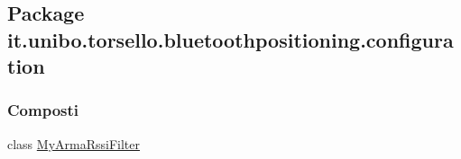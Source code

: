 \hypertarget{namespaceit_1_1unibo_1_1torsello_1_1bluetoothpositioning_1_1configuration}{}\subsection{Package it.\+unibo.\+torsello.\+bluetoothpositioning.\+configuration}
\label{namespaceit_1_1unibo_1_1torsello_1_1bluetoothpositioning_1_1configuration}
\subsubsection*{Composti}
\begin{DoxyCompactItemize}
\item 
class \hyperlink{classit_1_1unibo_1_1torsello_1_1bluetoothpositioning_1_1configuration_1_1MyArmaRssiFilter}{My\+Arma\+Rssi\+Filter}
\end{DoxyCompactItemize}
